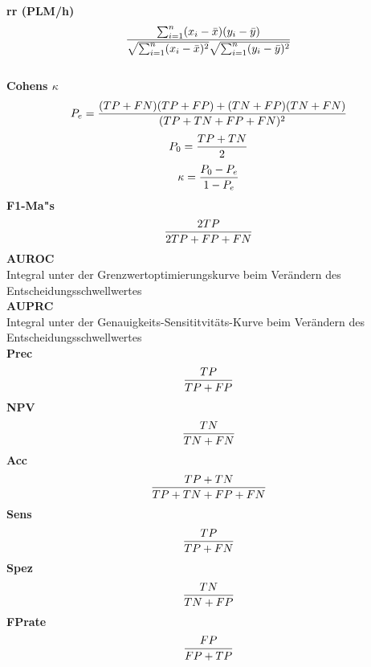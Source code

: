 \noindent\textbf{\gls{rr} (PLM/h)}\\ 
\begin{equation}\frac{ \sum_{i=1}^{n} (x_i - \Bar{x})(y_i - \Bar{y})}{\sqrt{\sum_{i=1}^{n} (x_i - \Bar{x})^{2}} \sqrt{\sum_{i=1}^{n} (y_i - \Bar{y})^{2}}}\end{equation}\\
\textbf{Cohens $\kappa$}\\
\begin{equation}
P_e = \frac{(TP+FN)(TP+FP)+(TN+FP)(TN+FN)}{(TP+TN+FP+FN)^{2}}\\\end{equation}
\begin{equation}P_0 = \frac{TP+TN}{2}\\\end{equation}
\begin{equation}\kappa = \frac{P_0 - P_e}{1-P_e}\\\end{equation}
\textbf{F1-Ma"s}\\
\begin{equation}\frac{2TP}{2TP+FP+FN}\\\end{equation}
\textbf{AUROC}\\
Integral unter der Grenzwertoptimierungskurve beim Verändern des Entscheidungsschwellwertes\\
\textbf{AUPRC}\\
Integral unter der Genauigkeits-Sensititvitäts-Kurve beim Verändern des Entscheidungsschwellwertes\\
\textbf{\gls{Prec}}\\
\begin{equation}\frac{TP}{TP+FP}\\\end{equation}
\textbf{\gls{NPV}}\\
\begin{equation}\frac{TN}{TN+FN}\\\end{equation}
\textbf{\gls{Acc}}\\
\begin{equation}\frac{TP+TN}{TP+TN+FP+FN}\\\end{equation}
\newpage
\noindent
\textbf{\gls{Sens}}\\
\begin{equation}\frac{TP}{TP+FN}\\\end{equation}
\textbf{\gls{Spez}}\\
\begin{equation}\frac{TN}{TN+FP}\\\end{equation}
\textbf{\gls{FPrate}}\\
\begin{equation}\frac{FP}{FP+TP}\\\end{equation}


